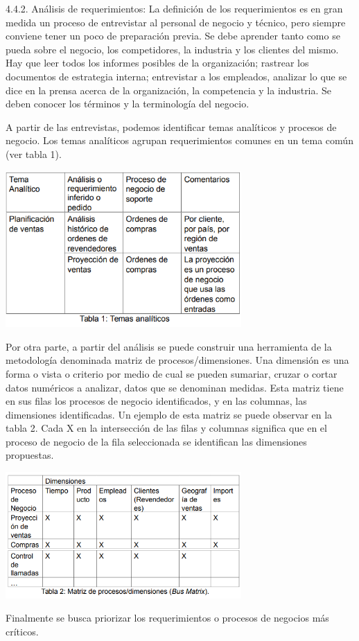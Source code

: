 \documentclass[%
 reprint,
 amsmath,amssymb,
 aps,
]{revtex4-1}
\begin{document}
4.4.2. Análisis de requerimientos:
La definición de los requerimientos es en gran medida un proceso de entrevistar al personal de negocio y técnico, pero siempre conviene tener un poco de preparación previa. Se debe aprender tanto como se pueda sobre el negocio, los competidores, la industria y los clientes del mismo. Hay que leer todos los informes posibles de la organización; rastrear los documentos de estrategia interna; entrevistar a los empleados, analizar lo que se dice en la prensa acerca de la organización, la competencia y la industria. Se deben conocer los términos y la terminología del negocio. \cite{estrella5}

A partir de las entrevistas, podemos identificar temas analíticos y procesos de negocio. Los temas analíticos agrupan requerimientos
comunes en un tema común (ver tabla 1).
	            \begin{center}
					\includegraphics[width=9cm]{./IMAGENES/img02}
				\end{center}

Por otra parte, a partir del análisis se puede construir una herramienta de la metodología denominada matriz de procesos/dimensiones.
Una dimensión es una forma o vista o criterio por medio de cual se pueden sumariar, cruzar o cortar datos numéricos a analizar, datos que se denominan medidas.\cite{estrella8}
Esta matriz tiene en sus filas los procesos de negocio identificados,
y en las columnas, las dimensiones identificadas.
Un ejemplo de esta matriz se puede observar en la tabla 2. Cada X en la intersección de las filas y columnas significa que en el proceso de negocio de la fila seleccionada se identifican las dimensiones propuestas. 
                 \begin{center}
					\includegraphics[width=9cm]{./IMAGENES/img03}
				\end{center}
Finalmente se busca priorizar los requerimientos o procesos de negocios más críticos. 
\end{document}
